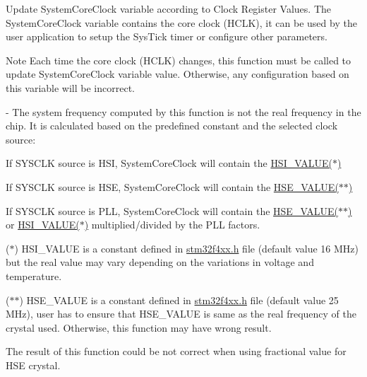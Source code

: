 Update System\-Core\-Clock variable according to Clock Register Values. The System\-Core\-Clock variable contains the core clock (H\-C\-L\-K), it can be used by the user application to setup the Sys\-Tick timer or configure other parameters. 

\begin{DoxyNote}{Note}
Each time the core clock (H\-C\-L\-K) changes, this function must be called to update System\-Core\-Clock variable value. Otherwise, any configuration based on this variable will be incorrect.

-\/ The system frequency computed by this function is not the real frequency in the chip. It is calculated based on the predefined constant and the selected clock source\-:
\begin{DoxyItemize}
\item If S\-Y\-S\-C\-L\-K source is H\-S\-I, System\-Core\-Clock will contain the \hyperlink{group___library__configuration__section_gaaa8c76e274d0f6dd2cefb5d0b17fbc37}{H\-S\-I\-\_\-\-V\-A\-L\-U\-E($\ast$)}
\item If S\-Y\-S\-C\-L\-K source is H\-S\-E, System\-Core\-Clock will contain the \hyperlink{group___library__configuration__section_gaeafcff4f57440c60e64812dddd13e7cb}{H\-S\-E\-\_\-\-V\-A\-L\-U\-E($\ast$$\ast$)}
\item If S\-Y\-S\-C\-L\-K source is P\-L\-L, System\-Core\-Clock will contain the \hyperlink{group___library__configuration__section_gaeafcff4f57440c60e64812dddd13e7cb}{H\-S\-E\-\_\-\-V\-A\-L\-U\-E($\ast$$\ast$)} or \hyperlink{group___library__configuration__section_gaaa8c76e274d0f6dd2cefb5d0b17fbc37}{H\-S\-I\-\_\-\-V\-A\-L\-U\-E($\ast$)} multiplied/divided by the P\-L\-L factors.
\end{DoxyItemize}
\end{DoxyNote}
($\ast$) H\-S\-I\-\_\-\-V\-A\-L\-U\-E is a constant defined in \hyperlink{stm32f4xx_8h}{stm32f4xx.\-h} file (default value 16 M\-Hz) but the real value may vary depending on the variations in voltage and temperature.

($\ast$$\ast$) H\-S\-E\-\_\-\-V\-A\-L\-U\-E is a constant defined in \hyperlink{stm32f4xx_8h}{stm32f4xx.\-h} file (default value 25 M\-Hz), user has to ensure that H\-S\-E\-\_\-\-V\-A\-L\-U\-E is same as the real frequency of the crystal used. Otherwise, this function may have wrong result.
\begin{DoxyItemize}
\item The result of this function could be not correct when using fractional value for H\-S\-E crystal.
\end{DoxyItemize}


